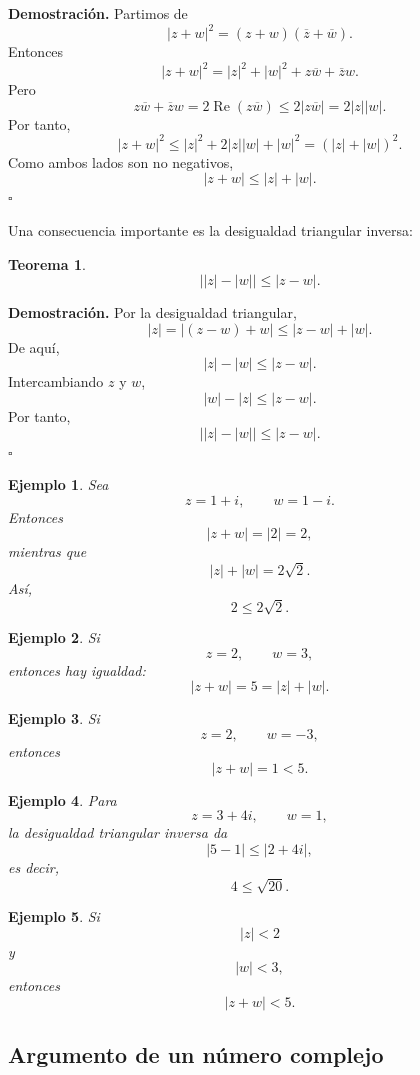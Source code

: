 \documentclass[12pt]{article}
\newtheorem{Ejem}{Ejemplo}
\newtheorem{Teo}{Teorema}
\begin{document}
\textbf{Demostración.}
Partimos de
\[
|z+w|^2
=
(z+w)(\overline z+\overline w).
\]
Entonces
\[
|z+w|^2
=
|z|^2+|w|^2+z\overline w+\overline z w.
\]
Pero
\[
z\overline w+\overline z w
=
2\operatorname{Re}(z\overline w)
\leq
2|z\overline w|
=
2|z||w|.
\]
Por tanto,
\[
|z+w|^2
\leq
|z|^2+2|z||w|+|w|^2
=
(|z|+|w|)^2.
\]
Como ambos lados son no negativos,
\[
|z+w|\leq |z|+|w|.
\]
\hfill$\square$

Una consecuencia importante es la desigualdad triangular inversa:


\begin{Teo} 
\[
\boxed{
\bigl||z|-|w|\bigr|
\leq
|z-w|.
}
\]
\end{Teo}

 
\textbf{Demostración.}
Por la desigualdad triangular,
\[
|z|
=
|(z-w)+w|
\leq
|z-w|+|w|.
\]
De aquí,
\[
|z|-|w|
\leq
|z-w|.
\]
Intercambiando $z$ y $w$,
\[
|w|-|z|
\leq
|z-w|.
\]
Por tanto,
\[
\bigl||z|-|w|\bigr|
\leq
|z-w|.
\]
\hfill$\square$


\begin{Ejem} 
Sea
\[
z=1+i,
\qquad
w=1-i.
\]
Entonces
\[
|z+w|
=
|2|
=
2,
\]
mientras que
\[
|z|+|w|
=
2\sqrt2.
\]
Así,
\[
2\leq2\sqrt2.
\]

\end{Ejem}

\begin{Ejem} 
Si
\[
z=2,
\qquad
w=3,
\]
entonces hay igualdad:
\[
|z+w|=5=|z|+|w|.
\]

\end{Ejem}

\begin{Ejem} Si
\[
z=2,
\qquad
w=-3,
\]
entonces
\[
|z+w|=1<5.
\]

\end{Ejem}

\begin{Ejem} Para
\[
z=3+4i,
\qquad
w=1,
\]
la desigualdad triangular inversa da
\[
\bigl|5-1\bigr|
\leq
|2+4i|,
\]
es decir,
\[
4\leq\sqrt{20}.
\]

\end{Ejem}

\begin{Ejem} Si
\[
|z|<2
\]
y
\[
|w|<3,
\]
entonces
\[
|z+w|
<
5.
\]
\end{Ejem}


\subsection*{Argumento de un número complejo}
\end{document}
